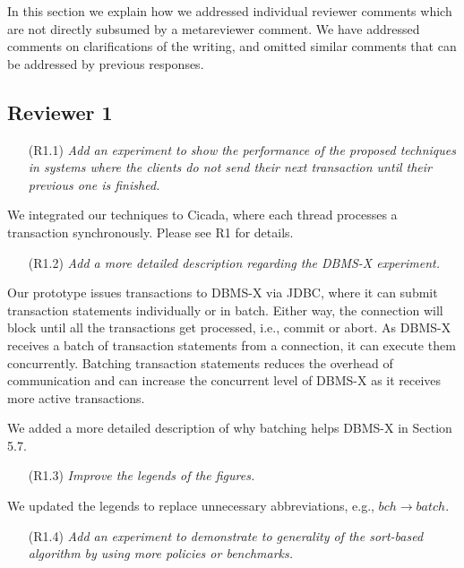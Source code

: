 \documentclass{article}
\newcommand{\changed}[1]{#1}
\newcommand{\changed}[1]{{\color{blue}#1}}
\begin{document}
In this section we explain how we addressed individual reviewer comments which are not directly subsumed by a metareviewer comment. We have addressed comments on clarifications of the writing, and omitted similar comments that can be addressed by previous responses.

\subsection{Reviewer 1}

\begin{itemize}
\item[(R1.1)] \emph{Add an experiment to show the performance of the proposed techniques in systems where the clients do not send their next transaction until their previous one is finished.}
\end{itemize}
\changed{
	We integrated our techniques to Cicada, where each thread processes a transaction synchronously. Please see R1 for details.
}

\begin{itemize}
\item[(R1.2)] \emph{Add a more detailed description regarding the DBMS-X experiment.}
\end{itemize}

\changed{
	Our prototype issues transactions to DBMS-X via JDBC, where it can submit transaction statements individually or in batch. Either way, the connection will block until all the transactions get processed, i.e., commit or abort. As DBMS-X receives a batch of transaction statements from a connection, it can execute them concurrently. Batching transaction statements reduces the overhead of communication and can increase the concurrent level of DBMS-X as it receives more active transactions.
	
	We added a more detailed description of why batching helps DBMS-X in Section 5.7.
}

\begin{itemize}
\item[(R1.3)] \emph{Improve the legends of the figures.}
\end{itemize}

\changed{
	We updated the legends to replace unnecessary abbreviations, e.g., $bch \to batch$.
}

\begin{itemize}
\item[(R1.4)] \emph{Add an experiment to demonstrate to generality of the sort-based algorithm by using more policies or benchmarks.}
\end{itemize}
\end{document}
